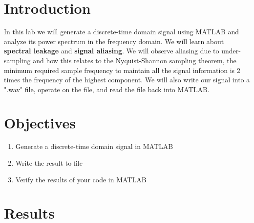 \documentclass{article}
\begin{document}


\hspace{0pt}
\vfill
\tableofcontents
\vfill
\hspace{0pt}
\newpage
\section{Introduction}
    In this lab we will generate a discrete-time domain signal using MATLAB and analyze its power spectrum in the frequency domain. We will learn about \textbf{spectral leakage} and \textbf{signal aliasing}. We will observe aliasing due to under-sampling and how this relates to the Nyquist-Shannon sampling theorem, the minimum required sample frequency to maintain all the signal information is 2 times the frequency of the highest component. We will also write our signal into a ".wav" file, operate on the file, and read the file back into MATLAB.


\section{Objectives}
    \begin{enumerate}
      \item Generate a discrete-time domain signal in MATLAB
      \item Write the result to file
      \item Verify the results of your code in MATLAB
    \end{enumerate}

\section{Results}
\end{document}
